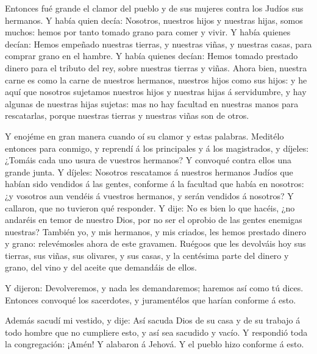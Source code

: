  Entonces fué grande el clamor del pueblo y de sus mujeres
contra los Judíos sus hermanos.  Y había quien decía:
Nosotros, nuestros hijos y nuestras hijas, somos muchos: hemos por tanto
tomado grano para comer y vivir.  Y había quienes decían:
Hemos empeñado nuestras tierras, y nuestras viñas, y nuestras casas,
para comprar grano en el hambre.  Y había quienes decían:
Hemos tomado prestado dinero para el tributo del rey, sobre nuestras
tierras y viñas.  Ahora bien, nuestra carne es como la carne
de nuestros hermanos, nuestros hijos como sus hijos: y he aquí que
nosotros sujetamos nuestros hijos y nuestras hijas á servidumbre, y hay
algunas de nuestras hijas sujetas: mas no hay facultad en nuestras manos
para rescatarlas, porque nuestras tierras y nuestras viñas son de otros.

 Y enojéme en gran manera cuando oí su clamor y estas
palabras.  Meditélo entonces para conmigo, y reprendí á los
principales y á los magistrados, y díjeles: ¿Tomáis cada uno usura de
vuestros hermanos? Y convoqué contra ellos una grande junta.
 Y díjeles: Nosotros rescatamos á nuestros hermanos Judíos
que habían sido vendidos á las gentes, conforme á la facultad que había
en nosotros: ¿y vosotros aun vendéis á vuestros hermanos, y serán
vendidos á nosotros? Y callaron, que no tuvieron qué responder.
 Y dije: No es bien lo que hacéis, ¿no andaréis en temor de
nuestro Dios, por no ser el oprobio de las gentes enemigas nuestras?
 También yo, y mis hermanos, y mis criados, les hemos
prestado dinero y grano: relevémosles ahora de este gravamen.
 Ruégoos que les devolváis hoy sus tierras, sus viñas, sus
olivares, y sus casas, y la centésima parte del dinero y grano, del vino
y del aceite que demandáis de ellos.

 Y dijeron: Devolveremos, y nada les demandaremos; haremos
así como tú dices. Entonces convoqué los sacerdotes, y juramentélos que
harían conforme á esto.

 Además sacudí mi vestido, y dije: Así sacuda Dios de su
casa y de su trabajo á todo hombre que no cumpliere esto, y así sea
sacudido y vacío. Y respondió toda la congregación: ¡Amén! Y alabaron á
Jehová. Y el pueblo hizo conforme á esto.

